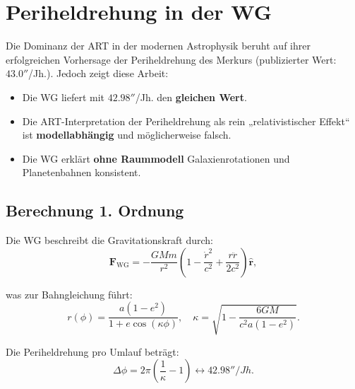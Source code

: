 \section{Periheldrehung in der WG}
Die Dominanz der ART in der modernen Astrophysik beruht auf ihrer erfolgreichen Vorhersage der Periheldrehung des Merkurs \cite{einstein1915} (publizierter Wert: $43.0''$/Jh.). Jedoch zeigt diese Arbeit:
\begin{itemize}
    \item Die WG liefert mit $42.98''$/Jh. den \textbf{gleichen Wert}.
    \item Die ART-Interpretation der Periheldrehung als rein „relativistischer Effekt“ ist \textbf{modellabhängig} und möglicherweise falsch.
    \item Die WG erklärt \textbf{ohne Raummodell} Galaxienrotationen und Planetenbahnen konsistent.
\end{itemize}

\subsection{Berechnung 1. Ordnung}
Die WG beschreibt die Gravitationskraft durch:
\begin{equation}
\mathbf{F}_{\text{WG}} = -\frac{GMm}{r^2}\left(1 - \frac{\dot{r}^2}{c^2} + \frac{r\ddot{r}}{2c^2}\right)\hat{\mathbf{r}},
\end{equation}

was zur Bahngleichung führt:
\begin{equation}
r(\phi) = \frac{a(1-e^2)}{1 + e \cos\left(\kappa \phi\right)}, \quad \kappa = \sqrt{1 - \frac{6GM}{c^2 a (1-e^2)}}.
\end{equation}

Die Periheldrehung pro Umlauf beträgt:
\begin{equation}
\Delta\phi = 2\pi\left(\frac{1}{\kappa} - 1\right) \leftrightarrow 42.98'' /Jh.
\end{equation}
